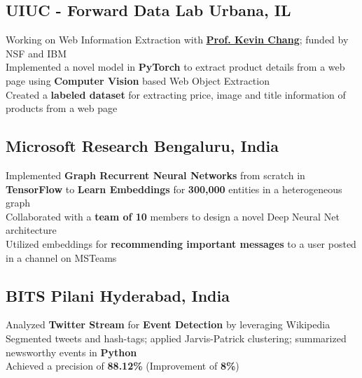 \documentclass[]{Keval-resume}
\begin{document}
\subsection{UIUC - Forward Data Lab \hfill \normalfont U\lowercase{rbana}, IL}
\textbullet{} Working on Web Information Extraction with \href{http://www.forwarddatalab.org/kevinccchang}{\textbf{Prof. Kevin Chang}}; funded by NSF and IBM \\
\textbullet{} Implemented a novel model in \textbf{PyTorch} to extract product details from a web page using \textbf{Computer Vision} based Web Object Extraction \\
\textbullet{} Created a \textbf{labeled dataset} for extracting price, image and title information of products from a web page
\sectionsep

\subsection{Microsoft Research \hfill \normalfont B\lowercase{engaluru}, I\lowercase{ndia}}
\textbullet{} Implemented \textbf{Graph Recurrent Neural Networks} from scratch in \textbf{TensorFlow} to \textbf{Learn Embeddings} for \textbf{300,000} entities in a heterogeneous graph \\
\textbullet{} Collaborated with a \textbf{team of 10} members to design a novel Deep Neural Net architecture \\
\textbullet{} Utilized embeddings for \textbf{recommending important messages} to a user posted in a channel on MSTeams
\sectionsep

\subsection{BITS Pilani \hfill \normalfont H\lowercase{yderabad}, I\lowercase{ndia}}
\textbullet{} Analyzed \textbf{Twitter Stream} for \textbf{Event Detection} by leveraging Wikipedia \\
\textbullet{} Segmented tweets and hash-tags; applied Jarvis-Patrick clustering; summarized newsworthy events in \textbf{Python}\\
\textbullet{} Achieved a precision of \textbf{88.12\%} (Improvement of \textbf{8\%})
\sectionsep
\end{document}
